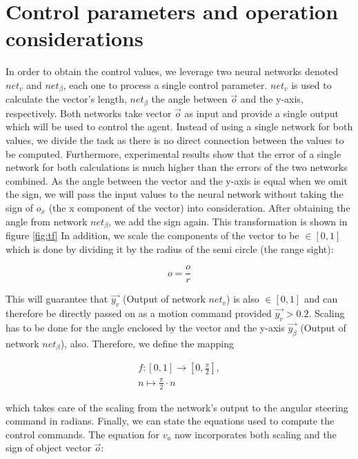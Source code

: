 \documentclass[10pt,a4paper,DIV=11]{scrreprt}
\begin{document}
\section{Control parameters and operation considerations}
In order to obtain the control values, we leverage two neural networks denoted $net_v$ and $net_{\beta}$, each one to process a single control parameter. 
$net_v$ is used to calculate the vector's length, $net_{\beta}$ the angle between $\overrightarrow{o}$ and the y-axis, respectively.
Both networks take 
vector $\overrightarrow{o}$ as input and provide a single output which will be used to control the agent. Instead of using a single network
for both values, we divide the task as there is no direct connection between the values to be computed. Furthermore, experimental results show that
the error of a single network for both calculations is much higher than the errors of the two networks combined. As the angle between
the vector and the y-axis is equal when we omit the sign, we will pass the input values to the neural network without taking the sign of $o_x$ (the x component
of the vector) into consideration. After obtaining the angle from network $net_{\beta}$, we add the sign again. This transformation is shown in figure \ref{fig:tf}
In addition, we scale the components of the vector to be $\in [0,1]$ which is done by dividing it by the radius of the semi circle (the range sight):

\begin{equation}
    o = \frac{o}{r}
\end{equation}

This will guarantee that $\overrightarrow{y_v}$ (Output of network $net_v$) is also $\in [0,1]$ and can therefore
be directly passed on as a motion command provided $\overrightarrow{y_v} > 0.2$. Scaling has to be done for the angle enclosed by the vector and the 
y-axis $\overrightarrow{y_\beta}$ (Output of network $net_\beta$), also. Therefore, we define the mapping

\begin{gather*} 
        f: [0,1] \rightarrow [0,\frac{\pi}{2}], \\ 
        n \mapsto \frac{\pi}{2} \cdot n
\end{gather*}

which takes care of the scaling from the network's output to the angular steering command in radians. Finally, we can state the equations used to
compute the control commands. The equation for $v_a$ now incorporates both scaling and the sign of object vector $\overrightarrow{o}$:
\end{document}
